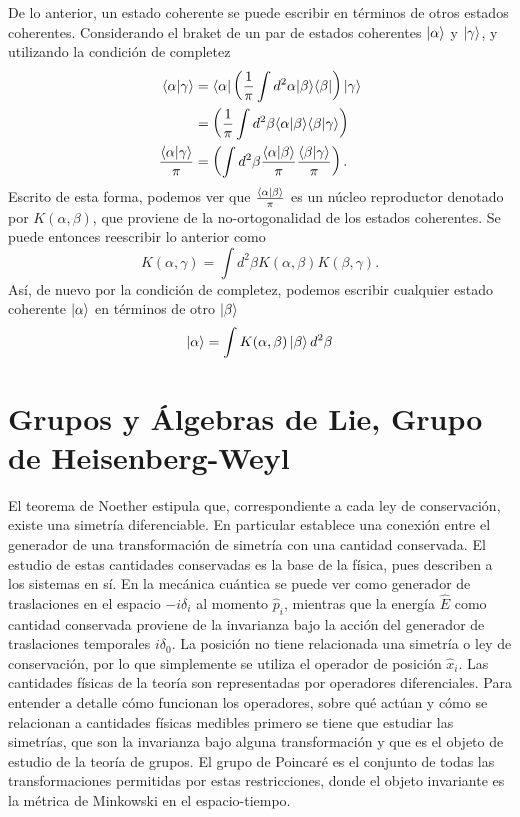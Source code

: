 De lo anterior, un estado coherente se puede escribir en términos de otros estados coherentes. Considerando el braket de un par de estados coherentes $\ket{\alpha}$ y $\ket{\gamma}$, y utilizando la condición de completez
\begin{align}
  \langle \alpha \vert \gamma \rangle           & =  \bra{{\alpha}}\left(\frac{1}{\pi}\int d^2 \alpha \vert \beta \rangle \langle \beta \vert \right) \vert \gamma \rangle  \\
                                                & = \left(\frac{1}{\pi}\int d^2 \beta \langle \alpha\vert \beta\rangle \langle\beta\vert\gamma\rangle \right)               \\
  \frac{\langle \alpha\vert \gamma\rangle}{\pi} & = \left(\int d^2 \beta \frac{\langle \alpha\vert \beta\rangle}{\pi} \frac{\langle \beta\vert \gamma\rangle}{\pi} \right).
\end{align}
Escrito de esta forma, podemos ver que $\frac{\braket{\alpha}{\beta}}{\pi}$ es un núcleo reproductor denotado por $K(\alpha, \beta)$, que proviene de la no-ortogonalidad de los estados coherentes. Se puede entonces reescribir lo anterior como
\begin{equation}
  K(\alpha, \gamma) = \int d^2 \beta K(\alpha, \beta) K(\beta, \gamma).
\end{equation}
Así, de nuevo por la condición de completez, podemos escribir cualquier estado coherente $\ket{\alpha}$ en términos de otro $\ket{\beta}$
\begin{equation}
  \ket{\alpha} = \int K(\alpha, \beta) \ket{\beta} d^2\beta
\end{equation}
\section{Grupos y Álgebras de Lie, Grupo de Heisenberg-Weyl}

El teorema de Noether estipula que, correspondiente a cada ley de conservación, existe una simetría diferenciable. En particular establece una conexión entre el generador de una transformación de simetría con una cantidad conservada. El estudio de estas cantidades conservadas es la base de la física, pues describen a los sistemas en sí. En la mecánica cuántica se puede ver como generador de traslaciones en el espacio $-i\delta_i$ al momento $\hat{p}_i$, mientras que la energía $\hat{E}$ como cantidad conservada proviene de la invarianza bajo la acción del generador de traslaciones temporales $i\delta_0$. La posición no tiene relacionada una simetría o ley de conservación, por lo que simplemente se utiliza el operador de posición $\hat{x}_i$. \cite{Schwichtenberg}
Las cantidades físicas de la teoría son representadas por operadores diferenciales. Para entender a detalle cómo funcionan los operadores, sobre qué actúan y cómo se relacionan a cantidades físicas medibles primero se tiene que estudiar las simetrías, que son la invarianza bajo alguna transformación y que es el objeto de estudio de la teoría de grupos. El grupo de Poincaré es el conjunto de todas las transformaciones permitidas por estas restricciones, donde el objeto invariante es la métrica de Minkowski en el espacio-tiempo.

